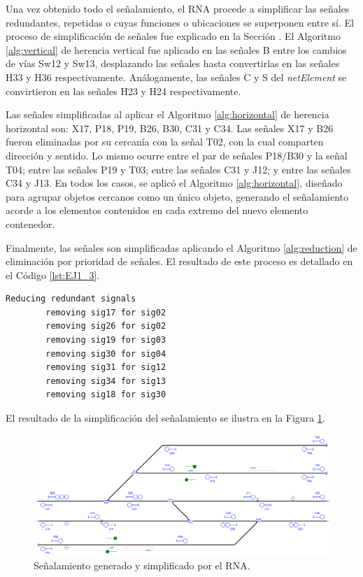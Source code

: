 	Una vez obtenido todo el señalamiento, el RNA procede a simplificar las señales redundantes, repetidas o cuyas funciones o ubicaciones se superponen entre sí. El proceso de simplificación de señales fue explicado en la Sección \label{sec:simplificacion}. El Algoritmo \ref{alg:vertical} de herencia vertical fue aplicado en las señales B entre los cambios de vías Sw12 y Sw13, desplazando las señales hasta convertirlas en las señales H33 y H36 respectivamente. Análogamente, las señales C y S del \textit{netElement} se convirtieron en las señales H23 y H24 respectivamente.
	
	Las señales simplificadas al aplicar el Algoritmo \ref{alg:horizontal} de herencia horizontal son: X17, P18, P19, B26, B30, C31 y C34. Las señales X17 y B26 fueron eliminadas por su cercanía con la señal T02, con la cual comparten dirección y sentido. Lo mismo ocurre entre el par de señales P18/B30 y la señal T04; entre las señales P19 y T03; entre las señales C31 y J12; y entre las señales C34 y J13. En todos los casos, se aplicó el Algoritmo \ref{alg:horizontal}, diseñado para agrupar objetos cercanos como un único objeto, generando el señalamiento acorde a los elementos contenidos en cada extremo del nuevo elemento contenedor.
	
	Finalmente, las señales son simplificadas aplicando el Algoritmo \ref{alg:reduction} de eliminación por prioridad de señales. El resultado de este proceso es detallado en el Código \ref{lst:EJ1_3}.
	
	\begin{lstlisting}[language = {}, caption = Reducción de señalamiento por prioridad de señales, label = {lst:EJ1_3}]
		Reducing redundant signals
		removing sig17 for sig02
		removing sig26 for sig02
		removing sig19 for sig03
		removing sig30 for sig04
		removing sig31 for sig12
		removing sig34 for sig13
		removing sig18 for sig30
	\end{lstlisting}
	
	El resultado de la simplificación del señalamiento se ilustra en la Figura \ref{fig:EJ1_7}.
	
	\begin{figure}[H]
		\centering
		\includegraphics[width=1\textwidth]{resultados-obtenidos/ejemplo1/images/1_RNA.png}
		\centering\caption{Señalamiento generado y simplificado por el RNA.}
		\label{fig:EJ1_7}
	\end{figure}
	
